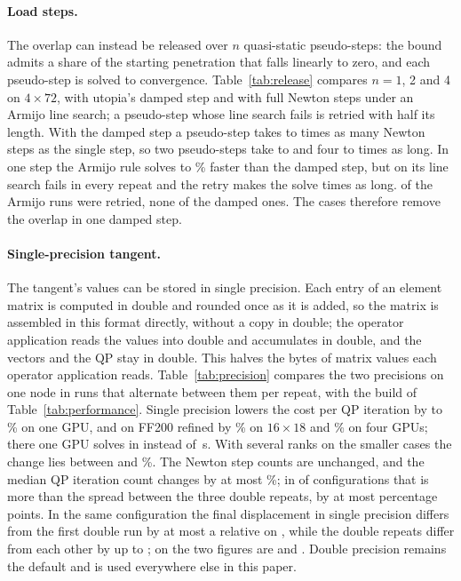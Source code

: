 \documentclass[sigconf,nonacm]{acmart}
\begin{document}
\paragraph{Load steps.} The overlap can instead be released over $n$ quasi-static pseudo-steps:
the bound admits a share of the starting penetration that falls linearly to zero, and each
pseudo-step is solved to convergence. Table~\ref{tab:release} compares $n=1$, 2 and 4 on
$4\times72$, with utopia's damped step and with full Newton steps under an Armijo line search; a
pseudo-step whose line search fails is retried with half its length. With the damped step a
pseudo-step takes \releasePerStepMin{} to \releasePerStepMax{} times as many Newton steps as the
single step, so two pseudo-steps take \releaseTwoMin{} to \releaseTwoMax{} and four
\releaseFourMin{} to \releaseFourMax{} times as long. In one step the Armijo rule solves
\armijoFasterCases{} \armijoGainMin{} to \armijoGainMax\% faster than the damped step, but on
\armijoCutbackCase{} its line search fails in every repeat and the retry makes the solve
\armijoCutbackSlower{} times as long. \armijoCutbackRuns{} of the \armijoRuns{} Armijo runs were
retried, none of the damped ones. The cases therefore remove the overlap in one damped step.

\paragraph{Single-precision tangent.} The tangent's values can be stored in single precision. Each
entry of an element matrix is computed in double and rounded once as it is added, so the matrix is
assembled in this format directly, without a copy in double; the operator application reads the
values into double and accumulates in double, and the vectors and the QP stay in double. This
halves the bytes of matrix values each operator application reads. Table~\ref{tab:precision}
compares the two precisions on one node in \precisionRuns{} runs that alternate between them per
repeat, with the build of Table~\ref{tab:performance}. Single precision lowers the cost per QP
iteration by \singleGpuOneMin{} to \singleGpuOneMax\% on one GPU, and on FF200 refined by
\singleRefinedGrace\% on $16\times18$ and \singleRefinedFour\% on four GPUs; there one GPU solves in
\solveSingleFFfGpuOne{} instead of \solveDoubleFFfGpuOne\,\si{\second}. With several ranks on the
smaller cases the change lies between \singleSmallMin{} and \singleSmallMax\%. The Newton step
counts are unchanged, and the median QP iteration count changes by at most \singleQpChange\%; in
\singleQpOutside{} of \singleQpConfigs{} configurations that is more than the spread between the
three double repeats, by at most \singleQpExcess{} percentage points. In the same configuration
the final displacement in single precision differs from the first double run by at most a
relative \agreeSingle{} on \convergedCases{}, while the double repeats differ from each other by
up to \agreeDouble{}; on \unconvergedCases{} the two figures are \agreeSingleUnconverged{} and
\agreeDoubleUnconverged{}. Double precision remains the default and is used everywhere else in
this paper.
\end{document}
